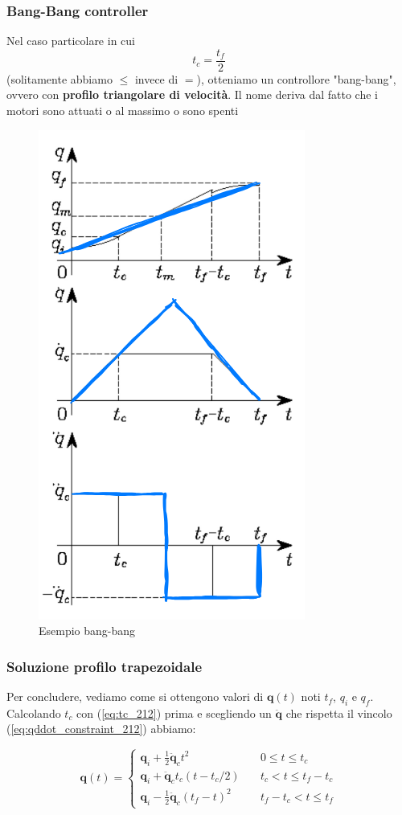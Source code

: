 \subsubsection{Bang-Bang controller}
Nel caso particolare in cui
$$
t_c = \frac{t_f}{2}
$$
(solitamente abbiamo $\leq$ invece di $=$), otteniamo un controllore "bang-bang", ovvero con \textbf{profilo triangolare di velocità}. Il nome deriva dal fatto che i motori sono attuati o al massimo o sono spenti
\begin{figure}[H]
	\centering
	\includegraphics[width=0.3\linewidth]{images/trajectories_10}
	\caption{Esempio bang-bang}
	\label{fig:trajectories10}
\end{figure}



\vspace*{10pt}
\subsubsection{Soluzione profilo trapezoidale}
Per concludere, vediamo come si ottengono valori di $\bm{q}(t)$ noti $t_f$, $q_i$ e $q_f$. Calcolando $t_c$ con (\ref{eq:tc_212}) prima e scegliendo un $\ddot{\bm{q}}$ che rispetta il vincolo (\ref{eq:qddot_constraint_212}) abbiamo:

$$
\boxed{
\bm{q}(t)
=
\begin{cases}
\bm{q}_i + \frac{1}{2} \ddot{\bm{q}}_c t^2 & \quad 0 \leq t \leq t_c \\
\bm{q}_i + \ddot{\bm{q}}_c t_c (t - t_c/2) & \quad t_c < t \leq t_f - t_c \\
\bm{q}_i - \frac{1}{2} \ddot{\bm{q}}_c (t_f - t)^2 & \quad t_f - t_c < t \leq t_f
\end{cases}
}
$$



